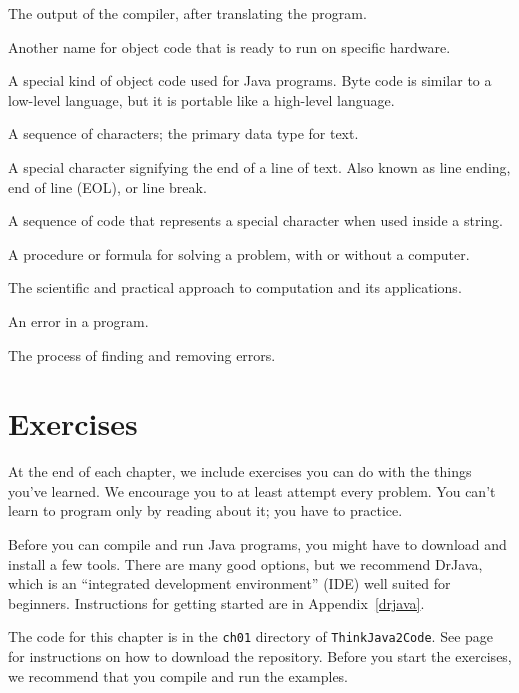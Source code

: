 \begin{description}
The output of the compiler, after translating the program.

Another name for object code that is ready to run on specific hardware.

A special kind of object code used for Java programs.
Byte code is similar to a low-level language, but it is portable like a high-level language.

A sequence of characters; the primary data type for text.

A special character signifying the end of a line of text.
Also known as line ending, end of line (EOL), or line break.


A sequence of code that represents a special character when used inside a string.

A procedure or formula for solving a problem, with or without a computer.

The scientific and practical approach to computation and its applications.

An error in a program.

The process of finding and removing errors.

\end{description}


\section{Exercises}

At the end of each chapter, we include exercises you can do with the things you've learned.
We encourage you to at least attempt every problem.
You can't learn to program only by reading about it; you have to practice.

Before you can compile and run Java programs, you might have to download and install a few tools.
There are many good options, but we recommend DrJava, which is an ``integrated development environment'' (IDE) well suited for beginners.
Instructions for getting started are in Appendix~\ref{drjava}.

The code for this chapter is in the {\tt ch01} directory of {\tt ThinkJava2Code}.
See page~\pageref{code} for instructions on how to download the repository.
Before you start the exercises, we recommend that you compile and run the examples.


